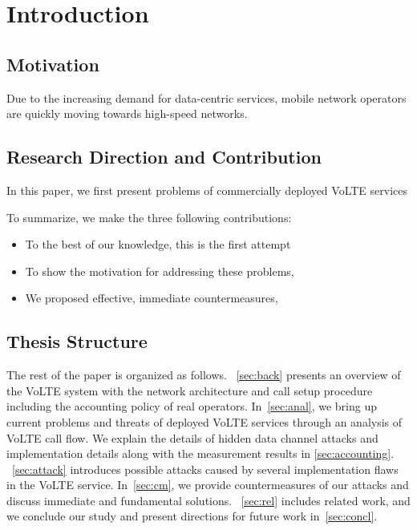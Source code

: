 \chapter{Introduction}
\label{sec:intro}

\section{Motivation}

Due to the increasing demand for data-centric services,
mobile network operators are quickly moving towards high-speed networks.


\section{Research Direction and Contribution}
In this paper, we first present problems of
commercially deployed VoLTE services

To summarize, we make the three following contributions:
\begin{itemize}
\item To the best of our knowledge, this is the first attempt
\item To show the motivation for addressing these problems, 
\item We proposed effective, immediate countermeasures,
\end{itemize}

\section{Thesis Structure}
The rest of the paper is organized as follows. ~\autoref{sec:back} presents an
overview of the VoLTE system with the network architecture and call setup procedure
including the accounting policy of real operators.  In~\autoref{sec:anal}, we bring
up current problems and threats of deployed VoLTE services through an analysis
of VoLTE call flow.  We explain the details of hidden data channel attacks and
implementation details along with the measurement results in
\autoref{sec:accounting}. ~\autoref{sec:attack} introduces possible attacks
caused by several implementation flaws in the VoLTE service.  In~\autoref{sec:cm},
we provide countermeasures of our attacks and discuss immediate and
fundamental solutions. ~\autoref{sec:rel} includes related work, and we
conclude our study and present directions for future work in~\autoref{sec:concl}.

